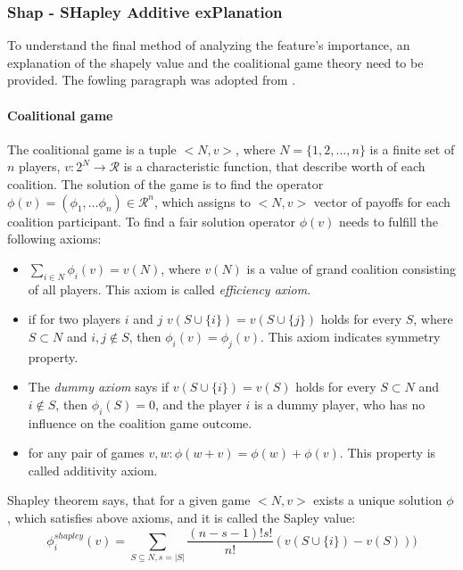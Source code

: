 \subsubsection{ Shap - SHapley Additive exPlanation }
\label{sec:lime}
To understand the final method of analyzing the feature's importance, an explanation of the shapely value and the coalitional game theory need to be provided. The fowling paragraph was adopted from \cite{GameTheory}. 

\paragraph{Coalitional game} \mbox{}

The coalitional game is a tuple $<N,v>$, where $N=\{1,2,\ldots, n \}$ is a finite set of $n$ players, $v: 2^{N} \rightarrow \mathcal{R}$ is a characteristic function, that describe worth of each coalition. The solution of the game is to find the operator $\phi(v) = (\phi_{1}, \ldots \phi_n ) \in \mathcal{R}^n$, which assigns to $<N,v>$ vector of payoffs for each coalition participant. To find a fair solution operator $\phi(v)$ needs to fulfill the following axioms: 

\begin{itemize}
\item  $\sum_{i \in N} \phi_{i}(v)= v(N)$, where $v(N)$ is a value of grand coalition consisting of all players. This axiom is called \textit{efficiency axiom}. 
\item if for two players $i$ and $j$ $v(S\cup \{i\}) = v(S \cup \{j\})$ holds for every $S$, where $S \subset N$ and $i,j \notin S$, then $\phi_{i}(v)= \phi_{j}(v)$. This axiom indicates symmetry property. 
 \item The \textit{dummy axiom} says if $v(S\cup \{i\}) =v(S)$ holds for every $S \subset N$ and $i \notin S$, then $\phi_i(S) = 0$, and the player $i$ is a dummy player, who has no influence on the coalition game outcome. 
 \item for any pair of games $v,w: \phi(w+v)= \phi(w)+\phi(v)$. This property is called additivity axiom.   
\end{itemize}

Shapley theorem says, that for a given game $<N,v>$ exists a unique solution $\phi$, which satisfies above axioms, and it is called the Sapley value:
\begin{equation}\label{eq:shapley_value}
    \phi_{i}^{shapley}(v) = \sum_{S \subseteq N, s=|S|} \frac{(n-s-1)!s!}{n!}(v(S\cup \{i\}) - v(S)))
\end{equation}

